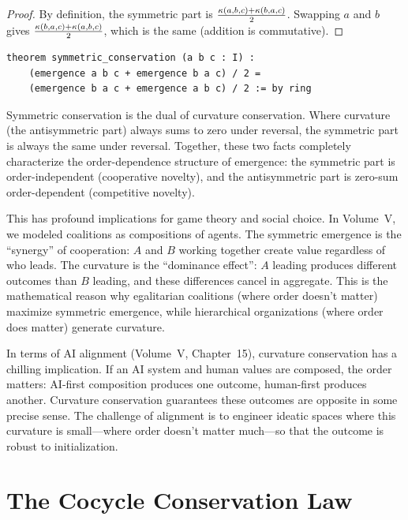\begin{proof}
By definition, the symmetric part is $\frac{\kappa(a,b,c) + \kappa(b,a,c)}{2}$.
Swapping $a$ and $b$ gives $\frac{\kappa(b,a,c) + \kappa(a,b,c)}{2}$, which
is the same (addition is commutative).
\end{proof}

\begin{lstlisting}[caption={Symmetric conservation (IDT\_v3\_Emergence.lean)}]
theorem symmetric_conservation (a b c : I) :
    (emergence a b c + emergence b a c) / 2 =
    (emergence b a c + emergence a b c) / 2 := by ring
\end{lstlisting}

\begin{interpretation}
Symmetric conservation is the dual of curvature conservation. Where curvature
(the antisymmetric part) always sums to zero under reversal, the symmetric part
is always the same under reversal. Together, these two facts completely
characterize the order-dependence structure of emergence: the symmetric part
is order-independent (cooperative novelty), and the antisymmetric part is
zero-sum order-dependent (competitive novelty).

This has profound implications for game theory and social choice. In Volume~V,
we modeled coalitions as compositions of agents. The symmetric emergence is
the ``synergy'' of cooperation: $A$ and $B$ working together create value
regardless of who leads. The curvature is the ``dominance effect'': $A$ leading
produces different outcomes than $B$ leading, and these differences cancel in
aggregate. This is the mathematical reason why egalitarian coalitions (where
order doesn't matter) maximize symmetric emergence, while hierarchical
organizations (where order does matter) generate curvature.

In terms of AI alignment (Volume~V, Chapter~15), curvature conservation has a
chilling implication. If an AI system and human values are composed, the order
matters: AI-first composition produces one outcome, human-first produces another.
Curvature conservation guarantees these outcomes are opposite in some precise
sense. The challenge of alignment is to engineer ideatic spaces where this
curvature is small---where order doesn't matter much---so that the outcome is
robust to initialization.
\end{interpretation}


\section{The Cocycle Conservation Law}

